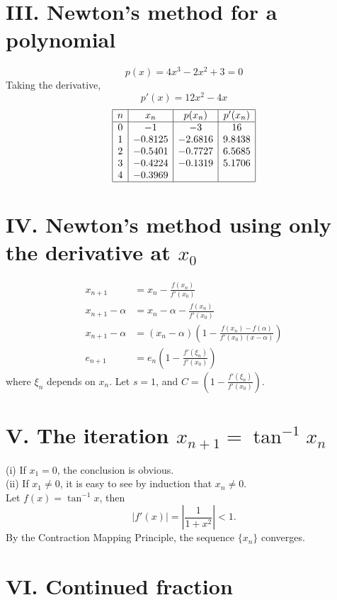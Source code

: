 \documentclass[a4paper]{article}
\begin{document}
\section*{III. Newton's method for a polynomial}

\[
p(x) = 4x^3 - 2x^2 + 3 = 0
\]
Taking the derivative,
\[
p'(x) = 12x^2 - 4x
\]
\[
\begin{array}{|c|c|c|c|}
\hline
n & x_n & p(x_n) & p'(x_n) \\
\hline
0 & -1 & -3 & 16 \\
1 & -0.8125 & -2.6816 & 9.8438 \\
2 & -0.5401 & -0.7727 & 6.5685 \\
3 & -0.4224 & -0.1319 & 5.1706 \\
4 & -0.3969 & & \\
\hline
\end{array}
\]

\section*{IV. Newton's method using only the derivative at $x_0$}

\begin{align*}
    x_{n+1} &= x_n - \frac{f(x_n)}{f'(x_0)} \\  
    x_{n+1} - \alpha &= x_n - \alpha - \frac{f(x_n)}{f'(x_0)} \\ 
    x_{n+1} - \alpha &= (x_n - \alpha) \left( 1 - \frac{f(x_n) - f(\alpha)}{f'(x_0)(x - \alpha)} \right)\\
    e_{n+1} &= e_n \left(1 - \frac{f'(\xi_n)}{f'(x_0)} \right)
\end{align*}
where $\xi_n$ depends on $x_n$. Let $s = 1$, and $C = \left(1 - \frac{f'(\xi_n)}{f'(x_0)} \right)$.

\section*{V. The iteration $x_{n+1} = \tan^{-1}x_n$}

(i) If $x_1 = 0$, the conclusion is obvious.\\
(ii) If $x_1 \neq 0$, it is easy to see by induction that $x_n \neq 0$.\\
Let $f(x) = \tan^{-1}x$, then $$|f'(x)| = \left| \frac{1}{1+x^2}\right| < 1.$$ By the Contraction Mapping Principle, the sequence $\{x_n\}$ converges.

\section*{VI. Continued fraction}
\end{document}
